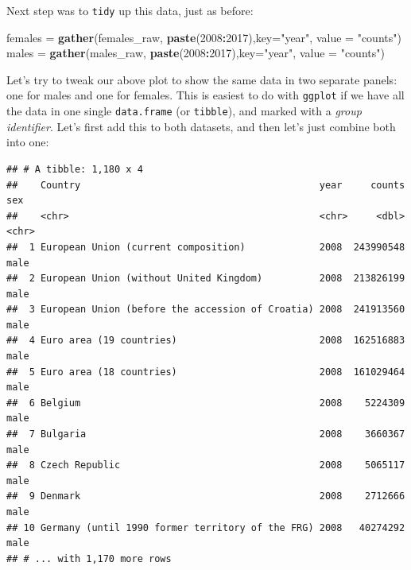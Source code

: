 \documentclass[]{book}
\newenvironment{Shaded}{\begin{snugshade}}{\end{snugshade}}
\newcommand{\KeywordTok}[1]{\textcolor[rgb]{0.13,0.29,0.53}{\textbf{#1}}}
\newcommand{\DataTypeTok}[1]{\textcolor[rgb]{0.13,0.29,0.53}{#1}}
\newcommand{\DecValTok}[1]{\textcolor[rgb]{0.00,0.00,0.81}{#1}}
\newcommand{\StringTok}[1]{\textcolor[rgb]{0.31,0.60,0.02}{#1}}
\newcommand{\CommentTok}[1]{\textcolor[rgb]{0.56,0.35,0.01}{\textit{#1}}}
\newcommand{\OperatorTok}[1]{\textcolor[rgb]{0.81,0.36,0.00}{\textbf{#1}}}
\newcommand{\NormalTok}[1]{#1}
\begin{document}
Next step was to \texttt{tidy} up this data, just as before:

\begin{Shaded}
\begin{Highlighting}[]
\NormalTok{females =}\StringTok{ }\KeywordTok{gather}\NormalTok{(females_raw, }\KeywordTok{paste}\NormalTok{(}\DecValTok{2008}\OperatorTok{:}\DecValTok{2017}\NormalTok{),}\DataTypeTok{key=}\StringTok{"year"}\NormalTok{, }\DataTypeTok{value =} \StringTok{"counts"}\NormalTok{)}
\NormalTok{males =}\StringTok{ }\KeywordTok{gather}\NormalTok{(males_raw, }\KeywordTok{paste}\NormalTok{(}\DecValTok{2008}\OperatorTok{:}\DecValTok{2017}\NormalTok{),}\DataTypeTok{key=}\StringTok{"year"}\NormalTok{, }\DataTypeTok{value =} \StringTok{"counts"}\NormalTok{)}
\end{Highlighting}
\end{Shaded}

Let's try to tweak our above plot to show the same data in two separate
panels: one for males and one for females. This is easiest to do with
\texttt{ggplot} if we have all the data in one single
\texttt{data.frame} (or \texttt{tibble}), and marked with a \emph{group
identifier}. Let's first add this to both datasets, and then let's just
combine both into one:

\begin{Shaded}
\end{Shaded}

\begin{verbatim}
## # A tibble: 1,180 x 4
##    Country                                          year     counts sex  
##    <chr>                                            <chr>     <dbl> <chr>
##  1 European Union (current composition)             2008  243990548 male 
##  2 European Union (without United Kingdom)          2008  213826199 male 
##  3 European Union (before the accession of Croatia) 2008  241913560 male 
##  4 Euro area (19 countries)                         2008  162516883 male 
##  5 Euro area (18 countries)                         2008  161029464 male 
##  6 Belgium                                          2008    5224309 male 
##  7 Bulgaria                                         2008    3660367 male 
##  8 Czech Republic                                   2008    5065117 male 
##  9 Denmark                                          2008    2712666 male 
## 10 Germany (until 1990 former territory of the FRG) 2008   40274292 male 
## # ... with 1,170 more rows
\end{verbatim}
\end{document}
